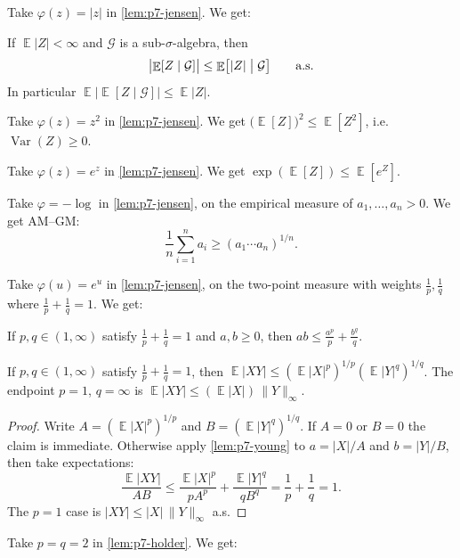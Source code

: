\documentclass[11pt,a4paper]{article}
\DeclareMathOperator{\Var}{Var}
\DeclareMathOperator{\E}{\mathbb{E}}
\begin{document}
Take \(\varphi(z)=\lvert z\rvert\) in \cref{lem:p7-jensen}. We get:

\begin{lemma}
\label{lem:p7-cond-jensen}
If \(\E\lvert Z\rvert<\infty\) and \(\mathcal{G}\) is a sub-\(\sigma\)-algebra, then
\[
\bigl\lvert\E[Z\mid\mathcal{G}]\bigr\rvert
\le
\E\bigl[\lvert Z\rvert\bigm|\mathcal{G}\bigr]
\qquad\text{a.s.}
\]
In particular \(\E\bigl\lvert\E[Z\mid\mathcal{G}]\bigr\rvert\le\E\lvert Z\rvert\).
\end{lemma}

Take \(\varphi(z)=z^2\) in \cref{lem:p7-jensen}. We get \(\bigl(\E[Z]\bigr)^2\le\E[Z^2]\), i.e.\ \(\Var(Z)\ge 0\).

Take \(\varphi(z)=e^{z}\) in \cref{lem:p7-jensen}. We get \(\exp(\E[Z])\le\E[e^{Z}]\).

Take \(\varphi=-\log\) in \cref{lem:p7-jensen}, on the empirical measure of \(a_1,\dots,a_n>0\). We get AM--GM:
\[
\frac1n\sum_{i=1}^n a_i
\ge
(a_1\cdots a_n)^{1/n}.
\]

Take \(\varphi(u)=e^{u}\) in \cref{lem:p7-jensen}, on the two-point measure with weights \(\frac1p,\frac1q\) where \(\frac1p+\frac1q=1\). We get:

\begin{lemma}[Young]
\label{lem:p7-young}
If \(p,q\in(1,\infty)\) satisfy \(\frac1p+\frac1q=1\) and \(a,b\ge 0\), then \(ab\le\frac{a^p}{p}+\frac{b^q}{q}\).
\end{lemma}

\begin{lemma}[H\"older]
\label{lem:p7-holder}
If \(p,q\in(1,\infty)\) satisfy \(\frac1p+\frac1q=1\), then \(\E\lvert XY\rvert\le(\E\lvert X\rvert^p)^{1/p}(\E\lvert Y\rvert^q)^{1/q}\). The endpoint \(p=1\), \(q=\infty\) is \(\E\lvert XY\rvert\le(\E\lvert X\rvert)\,\|Y\|_\infty\).
\end{lemma}

\begin{proof}
Write \(A=(\E\lvert X\rvert^p)^{1/p}\) and \(B=(\E\lvert Y\rvert^q)^{1/q}\). If \(A=0\) or \(B=0\) the claim is immediate. Otherwise apply \cref{lem:p7-young} to \(a=\lvert X\rvert/A\) and \(b=\lvert Y\rvert/B\), then take expectations:
\[
\frac{\E\lvert XY\rvert}{AB}
\le
\frac{\E\lvert X\rvert^p}{pA^p}
+
\frac{\E\lvert Y\rvert^q}{qB^q}
=
\frac1p+\frac1q
=
1.
\]
The \(p=1\) case is \(\lvert XY\rvert\le\lvert X\rvert\,\|Y\|_\infty\) a.s.
\end{proof}

Take \(p=q=2\) in \cref{lem:p7-holder}. We get:
\end{document}
